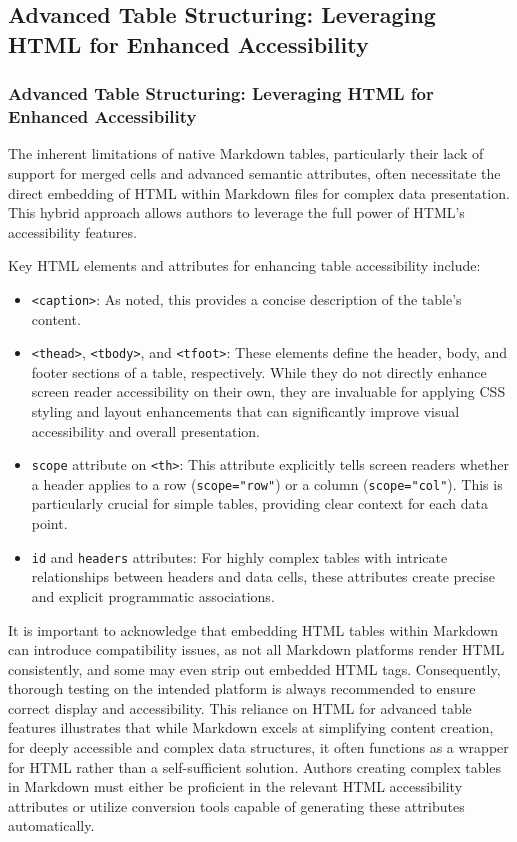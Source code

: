 \subsection{Advanced Table Structuring: Leveraging HTML for Enhanced Accessibility}
\subsubsection{Advanced Table Structuring: Leveraging HTML for Enhanced Accessibility}

The inherent limitations of native Markdown tables, particularly their lack of support for merged cells and advanced semantic attributes, often necessitate the direct embedding of HTML within Markdown files for complex data presentation. \cite{DocsToMarkdown} This hybrid approach allows authors to leverage the full power of HTML's accessibility features.

Key HTML elements and attributes for enhancing table accessibility include:
\begin{itemize}
    \item \texttt{<caption>}: As noted, this provides a concise description of the table's content. \cite{MDNTableAccess}
    \item \texttt{<thead>}, \texttt{<tbody>}, and \texttt{<tfoot>}: These elements define the header, body, and footer sections of a table, respectively. \cite{MDNTableAccess} While they do not directly enhance screen reader accessibility on their own, they are invaluable for applying CSS styling and layout enhancements that can significantly improve visual accessibility and overall presentation. \cite{MDNTableAccess}
    \item \texttt{scope} attribute on \texttt{<th>}: This attribute explicitly tells screen readers whether a header applies to a row (\texttt{scope="row"}) or a column (\texttt{scope="col"}). \cite{MDNTableAccess,OSUDigitalAccess} This is particularly crucial for simple tables, providing clear context for each data point. \cite{MDNTableAccess,OSUDigitalAccess}
    \item \texttt{id} and \texttt{headers} attributes: For highly complex tables with intricate relationships between headers and data cells, these attributes create precise and explicit programmatic associations. \cite{MDNTableAccess}
\end{itemize}
It is important to acknowledge that embedding HTML tables within Markdown can introduce compatibility issues, as not all Markdown platforms render HTML consistently, and some may even strip out embedded HTML tags. \cite{DocsToMarkdown} Consequently, thorough testing on the intended platform is always recommended to ensure correct display and accessibility. \cite{DocsToMarkdown} This reliance on HTML for advanced table features illustrates that while Markdown excels at simplifying content creation, for deeply accessible and complex data structures, it often functions as a wrapper for HTML rather than a self-sufficient solution. Authors creating complex tables in Markdown must either be proficient in the relevant HTML accessibility attributes or utilize conversion tools capable of generating these attributes automatically.

